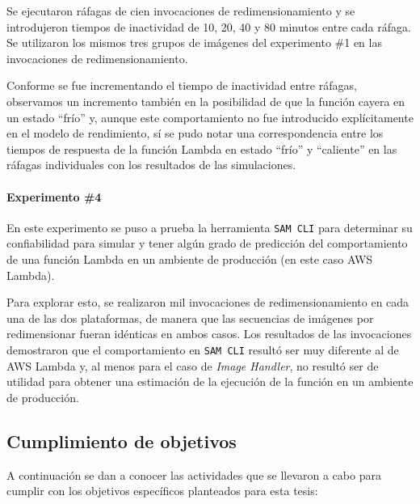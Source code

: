 Se ejecutaron ráfagas de cien invocaciones de redimensionamiento y se introdujeron tiempos de inactividad de 10, 20, 40 y 80 minutos entre cada ráfaga. Se utilizaron los mismos tres grupos de imágenes del experimento \#1 en las invocaciones de redimensionamiento.

Conforme se fue incrementando el tiempo de inactividad entre ráfagas, observamos un incremento también en la posibilidad de que la función cayera en un estado ``frío'' y, aunque este comportamiento no fue introducido explícitamente en el modelo de rendimiento, sí se pudo notar una correspondencia entre los tiempos de respuesta de la función Lambda en estado ``frío'' y ``caliente'' en las ráfagas individuales con los resultados de las simulaciones.

\paragraph{Experimento \#4} En este experimento se puso a prueba la herramienta \texttt{SAM CLI} para determinar su confiabilidad para simular y tener algún grado de predicción del comportamiento de una función Lambda en un ambiente de producción (en este caso AWS Lambda). 

Para explorar esto, se realizaron mil invocaciones de redimensionamiento en cada una de las dos plataformas, de manera que las secuencias de imágenes por redimensionar fueran idénticas en ambos casos. Los resultados de las invocaciones demostraron que el comportamiento en \texttt{SAM CLI} resultó ser muy diferente al de AWS Lambda y, al menos para el caso de \emph{Image Handler}, no resultó ser de utilidad para obtener una estimación de la ejecución de la función en un ambiente de producción.

\subsection{Cumplimiento de objetivos}
A continuación se dan a conocer las actividades que se llevaron a cabo para cumplir con los objetivos específicos planteados para esta tesis:


